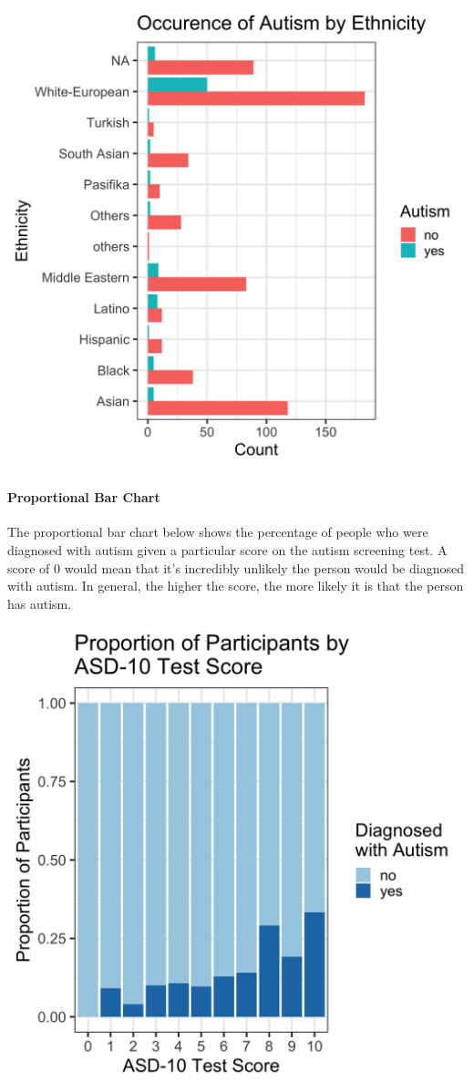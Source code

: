 \documentclass[]{article}
\let\oldparagraph\paragraph
\renewcommand{\paragraph}[1]{\oldparagraph{#1}\mbox{}}
\begin{document}
\includegraphics{../images/barplot.png}

\hypertarget{proportional-bar-chart}{%
\paragraph{Proportional Bar Chart}\label{proportional-bar-chart}}

The proportional bar chart below shows the percentage of people who were
diagnosed with autism given a particular score on the autism screening
test. A score of 0 would mean that it's incredibly unlikely the person
would be diagnosed with autism. In general, the higher the score, the
more likely it is that the person has autism.

\includegraphics{../images/propbarplot.png}
\end{document}
